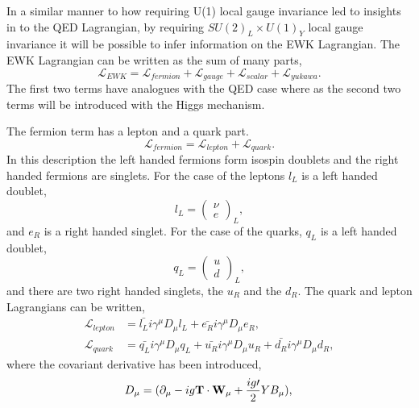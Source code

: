 In a similar manner to how requiring U(1) local gauge invariance led to insights
in to the QED Lagrangian, by requiring $SU(2)_{L} \times U(1)_{Y}$ local gauge
invariance it will be possible to infer information on the EWK Lagrangian.
The EWK Lagrangian can be written as the sum of many parts,
\begin{equation}
\mathcal{L}_{EWK} = 
\mathcal{L}_{fermion}
+ \mathcal{L}_{gauge}
+ \mathcal{L}_{scalar}
+ \mathcal{L}_{yukawa}.
\end{equation}
The first two terms have analogues with the QED case where as the second two
terms will be introduced with the Higgs mechanism.

The fermion term has a lepton and a quark part.
\begin{equation}
\mathcal{L}_{fermion} =
 \mathcal{L}_{lepton}
+ \mathcal{L}_{quark}.
\end{equation}
In this description the left handed fermions form isospin doublets and the right
handed fermions are singlets. For the case of the leptons $l_{L}$ is a left
handed doublet,
\begin{equation}
l_{L} = \left( \begin{matrix} \nu \\ e \end{matrix} \right)_{L},
\end{equation}
and $e_{R}$ is a right handed singlet.
For the case of the quarks, $q_{L}$ is a left handed doublet,
\begin{equation}
q_{L} = \left( \begin{matrix} u\\ d \end{matrix} \right)_{L},
\end{equation}
and there are two right handed singlets, the $u_{R}$ and the $d_{R}$.
The quark and lepton Lagrangians can be written,
\begin{align*}
\mathcal{L}_{lepton} &= 
\bar{l_{L}} i \gamma^{\mu} D_{\mu} l_{L} +
\bar{e_{R}} i \gamma^{\mu} D_{\mu} e_{R}, \\
\mathcal{L}_{quark} &= 
\bar{q_{L}} i \gamma^{\mu} D_{\mu} q_{L} +
\bar{u_{R}} i \gamma^{\mu} D_{\mu} u_{R} +
\bar{d_{R}} i \gamma^{\mu} D_{\mu} d_{R},
\end{align*}
where the covariant derivative has been introduced,
\begin{equation}
D_{\mu}
= (\partial_{\mu} 
- ig \mathbf{T} \cdot \mathbf{W}_{\mu}
+ \frac{ig\prime}{2} Y B_{\mu} ) ,\\
\end{equation}
